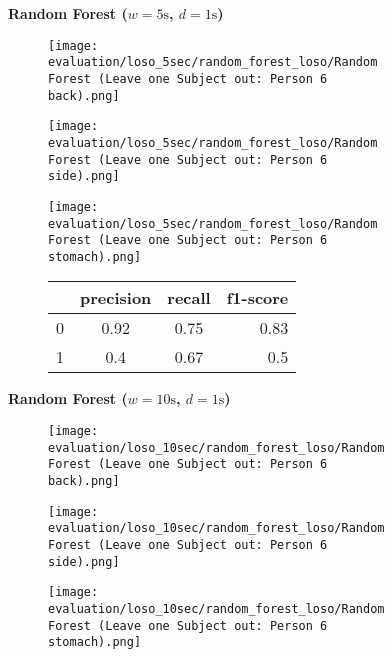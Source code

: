 \begin{figure}[ht!]
  \textbf{Random Forest ($w=5\si{\s}$, $d=1\si{\s}$)}
    \centering
    \begin{subfigure}{1\textwidth}
        \texttt{[image: evaluation/loso\_5sec/random\_forest\_loso/Random Forest (Leave one Subject out: Person 6 back).png]}
      \end{subfigure}
      \begin{subfigure}{1\textwidth}
        \texttt{[image: evaluation/loso\_5sec/random\_forest\_loso/Random Forest (Leave one Subject out: Person 6 side).png]}
      \end{subfigure}
      \begin{subfigure}{1\textwidth}
        \texttt{[image: evaluation/loso\_5sec/random\_forest\_loso/Random Forest (Leave one Subject out: Person 6 stomach).png]}
    \end{subfigure}
    \begin{subfigure}{1\textwidth}
        \begin{center}
            \begin{tabular}{ | l | c | c | r | }
              \hline
               & precision & recall & f1-score\\ \hline
              0 & 0.92 & 0.75 & 0.83 \\ \hline
              1 & 0.4  & 0.67 & 0.5 \\
              \hline
            \end{tabular}
        \end{center}
    \end{subfigure}
    \newline
    \vspace*{1 cm}
    \newline
    \textbf{Random Forest ($w=10\si{\s}$, $d=1\si{\s}$)}
    \begin{subfigure}{1\textwidth}
      \texttt{[image: evaluation/loso\_10sec/random\_forest\_loso/Random Forest (Leave one Subject out: Person 6 back).png]}
    \end{subfigure}
    \begin{subfigure}{1\textwidth}
      \texttt{[image: evaluation/loso\_10sec/random\_forest\_loso/Random Forest (Leave one Subject out: Person 6 side).png]}
    \end{subfigure}
    \begin{subfigure}{1\textwidth}
      \texttt{[image: evaluation/loso\_10sec/random\_forest\_loso/Random Forest (Leave one Subject out: Person 6 stomach).png]}
  \end{subfigure}


\end{figure}
